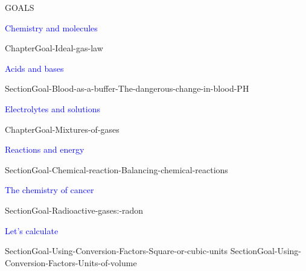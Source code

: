 \documentclass[main.tex]{subfiles}
\begin{document}
\begin{marginfigure}%
\begin{mytcbox}{GOALS}
%
\begin{center}\textcolor{blue}{\faEnvira Chemistry and molecules }\end{center}
\begin{enumerate}[label=\protect\circled{\color{white}\arabic*}]
  {ChapterGoal-Ideal-gas-law}
\end{enumerate}

\begin{center}\textcolor{blue}{\faFlask Acids and bases }\end{center}
\begin{enumerate}[label=\protect\circled{\color{white}\arabic*}]
{SectionGoal-Blood-as-a-buffer-The-dangerous-change-in-blood-PH}
\end{enumerate}

\begin{center}\textcolor{blue}{\faTint  Electrolytes and solutions }\end{center}
\begin{enumerate}[label=\protect\circled{\color{white}\arabic*}]
{ChapterGoal-Mixtures-of-gases}
\end{enumerate}

\begin{center}\textcolor{blue}{\faFire Reactions and energy} \end{center}
\begin{enumerate}[label=\protect\circled{\color{white}\arabic*}]
 {SectionGoal-Chemical-reaction-Balancing-chemical-reactions}
\end{enumerate}

\begin{center}\textcolor{blue}{\faFlash The chemistry of cancer} \end{center}
\begin{enumerate}[label=\protect\circled{\color{white}\arabic*}]
{SectionGoal-Radioactive-gases:-radon}
	\end{enumerate}
	
\begin{center}\textcolor{blue}{\faFlash Let's calculate} \end{center}
\begin{enumerate}[label=\protect\circled{\color{white}\arabic*}]
{SectionGoal-Using-Conversion-Factors-Square-or-cubic-units}
{SectionGoal-Using-Conversion-Factors-Units-of-volume}
\end{enumerate}
			 				 





\end{mytcbox}
\end{marginfigure}
\end{document}
